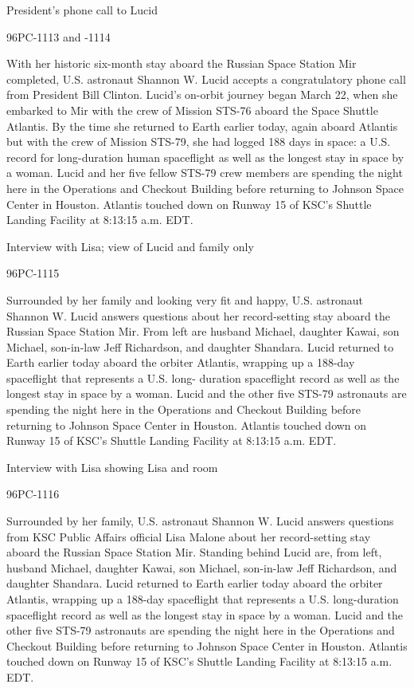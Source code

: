 \documentclass[11pt,a4paper]{article}
\begin{document}
President’s phone call to Lucid

96PC-1113 and -1114

With her historic six-month stay aboard the Russian Space Station Mir completed, U.S. astronaut Shannon W. Lucid accepts a congratulatory phone call from President Bill Clinton. Lucid’s on-orbit journey began March 22, when she embarked to Mir with the crew of Mission STS-76 aboard the Space Shuttle Atlantis. By the time she returned to Earth earlier today, again aboard Atlantis but with the crew of Mission STS-79, she had logged 188 days in space: a U.S. record for long-duration human spaceflight as well as the longest stay in space by a woman. Lucid and her five fellow STS-79 crew members are spending the night here in the Operations and Checkout Building before returning to Johnson Space Center in Houston. Atlantis touched down on Runway 15 of KSC’s Shuttle Landing Facility at 8:13:15 a.m. EDT.

Interview with Lisa; view of Lucid and family only

96PC-1115

Surrounded by her family and looking very fit and happy, U.S. astronaut Shannon W. Lucid answers questions about her record-setting stay aboard the Russian Space Station Mir. From left are husband Michael, daughter Kawai, son Michael, son-in-law Jeff Richardson, and daughter Shandara. Lucid returned to Earth earlier today aboard the orbiter Atlantis, wrapping up a 188-day spaceflight that represents a U.S. long- duration spaceflight record as well as the longest stay in space by a woman. Lucid and the other five STS-79 astronauts are spending the night here in the Operations and Checkout Building before returning to Johnson Space Center in Houston. Atlantis touched down on Runway 15 of KSC’s Shuttle Landing Facility at 8:13:15 a.m. EDT.

Interview with Lisa showing Lisa and room

96PC-1116

Surrounded by her family, U.S. astronaut Shannon W. Lucid answers questions from KSC Public Affairs official Lisa Malone about her record-setting stay aboard the Russian Space Station Mir. Standing behind Lucid are, from left, husband Michael, daughter Kawai, son Michael, son-in-law Jeff Richardson, and daughter Shandara. Lucid returned to Earth earlier today aboard the orbiter Atlantis, wrapping up a 188-day spaceflight that represents a U.S. long-duration spaceflight record as well as the longest stay in space by a woman. Lucid and the other five STS-79 astronauts are spending the night here in the Operations and Checkout Building before returning to Johnson Space Center in Houston. Atlantis touched down on Runway 15 of KSC’s Shuttle Landing Facility at 8:13:15 a.m. EDT.
\end{document}
